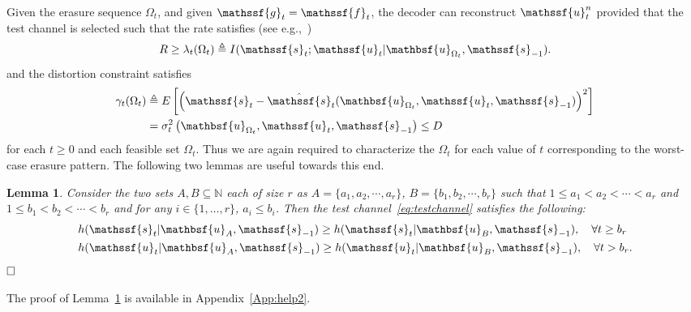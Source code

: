 \documentclass[journal, twocolumn, 10pt]{IEEEtran}
\newtheorem{lemma}{Lemma}
\newcommand{\rvf}{{\mathssf{f}}}    %
\newcommand{\rvg}{{\mathssf{g}}}    %
\newcommand{\rvs}{{\mathssf{s}}}    %
\newcommand{\rvu}{{\mathssf{u}}}    %
\newcommand{\rvbu}{{\mathbsf{u}}}
\begin{document}
{Given the erasure sequence $\Omega_t$, and given $\rvg_t = \rvf_t$, the decoder can reconstruct $\rvu_t^n$ provided that the test channel is selected such that the rate satisfies (see e.g.,~\cite{tavildar:10})
\begin{align}
R\ge \lambda_{t}(\Omega_t) \triangleq I(\rvs_{t} ; \rvu_{t} | \rvbu_{\Omega_t}, \rvs_{-1} ). \label{rate_c}
\end{align} and the distortion constraint satisfies
\begin{align}
\gamma_{t}(\Omega_t) &\triangleq E\left[\left(\rvs_{t} - \hat{\rvs}_{t}(\rvbu_{\Omega_t}, \rvu_t, \rvs_{-1})\right)^2\right] \notag\\
&= \sigma^2_{t} \left(\rvbu_{\Omega_t}, \rvu_t, \rvs_{-1}\right) \le D \label{tchannel_c}
\end{align}
for each $t \ge 0$ and each feasible set $\Omega_t$. Thus we are again required to characterize the $\Omega_t$ for each value of $t$ corresponding to the worst-case erasure pattern. The following two lemmas are useful towards this end.




 
\begin{lemma}
\label{lem:help2}
Consider the two sets $A, B\subseteq \mathbb{N}$ each of size $r$ as $A=\{a_{1},a_{2},\cdots,a_{r}\}$, $B=\{b_{1},b_{2},\cdots,b_{r}\}$ such that $1\le a_1<a_2<\cdots<a_r$ and $1\le b_1<b_2<\cdots<b_r$ and for any $i \in \{1,\ldots,r\}$, $a_{i} \le b_{i}$. Then the test channel~\eqref{eq:testchannel} satisfies the following: 
\begin{align}
&h(\rvs_{t}|\rvbu_{A},\rvs_{-1}) \ge h(\rvs_{t}|\rvbu_{B},\rvs_{-1}), \quad \forall t \ge b_r \label{eq:lem2-help2}\\
&h(\rvu_{t}|\rvbu_{A},\rvs_{-1}) \ge h(\rvu_{t}|\rvbu_{B},\rvs_{-1}), \quad \forall t > b_r \label{eq:lem1-help2}. 
\end{align}
$\hfill\Box$
\end{lemma}

The proof of Lemma~\ref{lem:help2} is available in Appendix~\ref{App:help2}.


}
\end{document}
